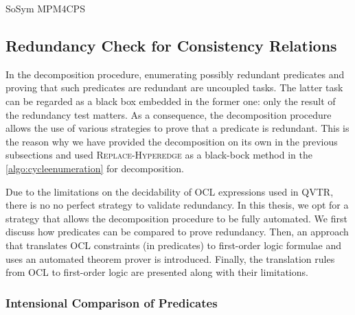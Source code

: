 \begin{copiedFrom}{SoSym MPM4CPS}

\subsection{Redundancy Check for Consistency Relations}
\label{chap:compatibility:practical_approach:redundancies}

In the decomposition procedure, enumerating possibly redundant predicates and proving that such predicates are redundant are uncoupled tasks. 
The latter task can be regarded as a black box embedded in the former one: only the result of the redundancy test matters. As a consequence, the decomposition procedure allows the use of various strategies to prove that a predicate is redundant. 
This is the reason why we have provided the decomposition on its own in the previous subsections and used \textsc{Replace-Hyperedge} as a black-bock method in the \autoref{algo:cycleenumeration} for decomposition. %

Due to the limitations on the decidability of OCL expressions used in \gls{QVTR}, there is no no perfect strategy to validate redundancy. In this thesis, we opt for a strategy that allows the decomposition procedure to be fully automated. We first discuss how predicates can be compared to prove redundancy. Then, an approach that translates OCL constraints (in predicates) to first-order logic formulae and uses an automated theorem prover is introduced. Finally, the translation rules from OCL to first-order logic are presented along with their limitations.

\subsubsection{Intensional Comparison of Predicates}


\end{copiedFrom}
